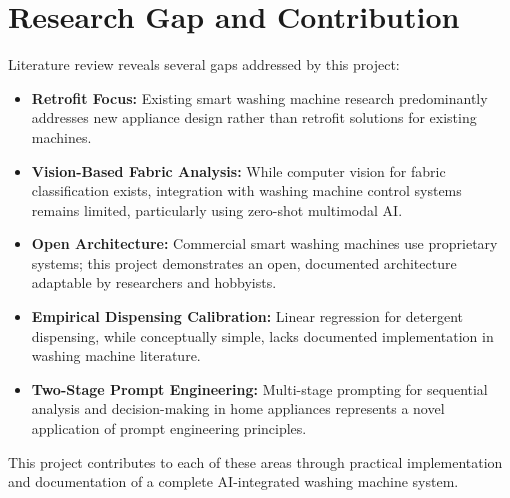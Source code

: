 \section{Research Gap and Contribution}
Literature review reveals several gaps addressed by this project:

\begin{itemize}
    \item \textbf{Retrofit Focus:} Existing smart washing machine research predominantly addresses new appliance design rather than retrofit solutions for existing machines.
    \item \textbf{Vision-Based Fabric Analysis:} While computer vision for fabric classification exists, integration with washing machine control systems remains limited, particularly using zero-shot multimodal AI.
    \item \textbf{Open Architecture:} Commercial smart washing machines use proprietary systems; this project demonstrates an open, documented architecture adaptable by researchers and hobbyists.
    \item \textbf{Empirical Dispensing Calibration:} Linear regression for detergent dispensing, while conceptually simple, lacks documented implementation in washing machine literature.
    \item \textbf{Two-Stage Prompt Engineering:} Multi-stage prompting for sequential analysis and decision-making in home appliances represents a novel application of prompt engineering principles.
\end{itemize}

This project contributes to each of these areas through practical implementation and documentation of a complete AI-integrated washing machine system.